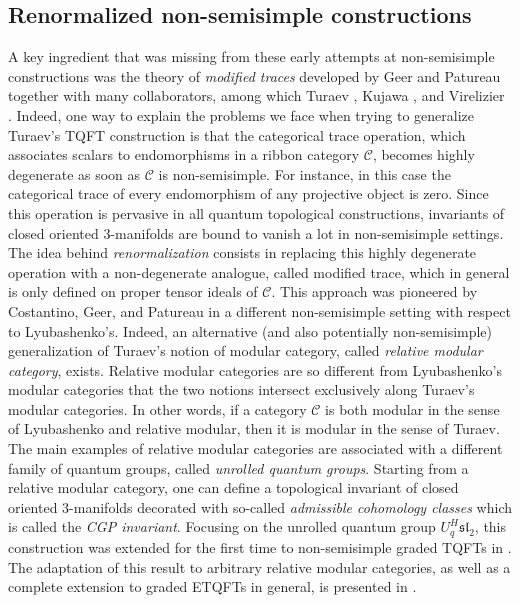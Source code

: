 \documentclass[a4paper,reqno]{amsart}
\theoremstyle{definition}
\theoremstyle{remark}
\newcommand{\calC}{\mathcal{C}}
\newcommand{\fsl}{\mathfrak{sl}}
\begin{document}
\subsection*{Renormalized non-semisimple constructions}\label{SS:renormalized_non-semisimple}

A key ingredient that was missing from these early attempts at non-semisimple constructions was the theory of \textit{modified traces} developed by Geer and Patureau together with many collaborators, among which Turaev \cite{GPT07}, Kujawa \cite{GKP10}, and Virelizier \cite{GPV11}. Indeed, one way to explain the problems we face when trying to generalize Turaev's TQFT construction is that the categorical trace operation, which associates scalars to endomorphisms in a ribbon category $\calC$, becomes highly degenerate as soon as $\calC$ is non-semisimple. For instance, in this case the categorical trace of every endomorphism of any projective object is zero. Since this operation is pervasive in all quantum topological constructions, invariants of closed oriented 3-manifolds are bound to vanish a lot in non-semisimple settings. The idea behind \textit{renormalization} consists in replacing this highly degenerate operation with a non-degenerate analogue, called modified trace, which in general is only defined on proper tensor ideals of $\calC$. This approach was pioneered by Costantino, Geer, and Patureau \cite{CGP12} in a different non-semisimple setting with respect to Lyubashenko's. Indeed, an alternative (and also potentially non-semisimple) generalization of Turaev's notion of modular category, called \textit{relative modular category}, exists. Relative modular categories are so different from Lyubashenko's modular categories that the two notions intersect exclusively along Turaev's modular categories. In other words, if a category $\calC$ is both modular in the sense of Lyubashenko and relative modular, then it is modular in the sense of Turaev. The main examples of relative modular categories are associated with a different family of quantum groups, called \textit{unrolled quantum groups}. Starting from a relative modular category, one can define a topological invariant of closed oriented 3-manifolds decorated with so-called \textit{admissible cohomology classes} which is called the \textit{CGP invariant}. Focusing on the unrolled quantum group $U^H_q \fsl_2$, this construction was extended for the first time to non-semisimple graded TQFTs in \cite{BCGP14}. The adaptation of this result to arbitrary relative modular categories, as well as a complete extension to graded ETQFTs in general, is presented in \cite{D17}.
\end{document}

